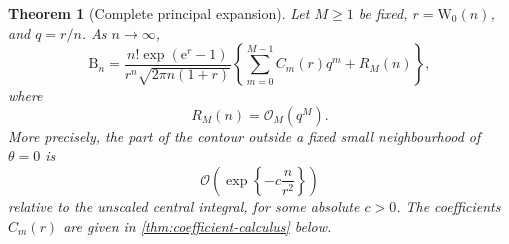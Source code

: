 \documentclass[11pt,a4paper]{article}
\newtheorem{theorem}{Theorem}[section]
\theoremstyle{definition}
\newcommand{\Bell}{\mathrm B}
\newcommand{\W}{\mathrm W}
\newcommand{\ee}{\mathrm e}
\newcommand{\bigO}{\mathcal O}
\begin{document}
\begin{theorem}[Complete principal expansion]\label{thm:principal}
Let $M\ge1$ be fixed, $r=\W_0(n)$, and $q=r/n$.  As $n\to\infty$,
\begin{equation}\label{eq:principal-theorem}
 \Bell_n=
 \frac{n!\exp(\ee^r-1)}{r^n\sqrt{2\pi n(1+r)}}
 \left\{\sum_{m=0}^{M-1}C_m(r)q^m+R_M(n)\right\},
\end{equation}
where
\begin{equation}\label{eq:principal-rem}
 R_M(n)=\bigO_M(q^M).
\end{equation}
More precisely, the part of the contour outside a fixed small neighbourhood
of $\theta=0$ is
\begin{equation}\label{eq:outer-exp-small}
 \bigO\!\left(\exp\!\left\{-c\frac{n}{r^2}\right\}\right)
\end{equation}
relative to the unscaled central integral, for some absolute $c>0$.  The
coefficients $C_m(r)$ are given in \cref{thm:coefficient-calculus} below.
\end{theorem}
\end{document}
